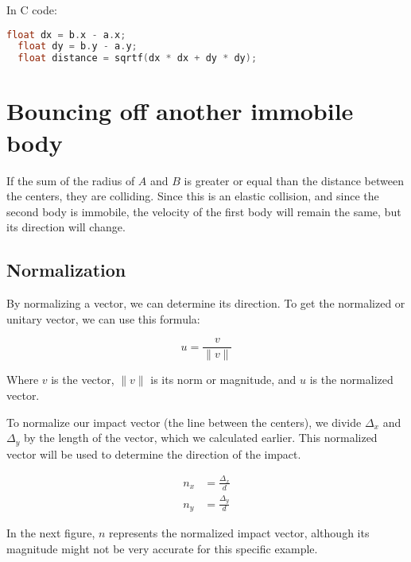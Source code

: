 \documentclass{amsart}
\begin{document}
In C code:

\begin{lstlisting}[language=C]
  float dx = b.x - a.x;
  float dy = b.y - a.y;
  float distance = sqrtf(dx * dx + dy * dy);
\end{lstlisting}

\section{Bouncing off another immobile body}

If the sum of the radius of $A$ and $B$ is greater or equal than the distance
between the centers, they are colliding. Since this is an elastic collision, and
since the second body is immobile, the velocity of the first body will remain
the same, but its direction will change.

\subsection{Normalization}

By normalizing a vector, we can determine its direction. To get the normalized
or unitary vector, we can use this formula:

\begin{displaymath}
  u = \frac{v}{\|v\|}
\end{displaymath}

Where $v$ is the vector, $\|v\|$ is its norm or magnitude, and $u$ is the
normalized vector.

To normalize our impact vector (the line between the centers), we divide
$\Delta_x$ and $\Delta_y$ by the length of the vector, which we calculated
earlier. This normalized vector will be used to determine the direction of the
impact.

\begin{align*}
  n_x &= \frac{\Delta_x}{d} \\
  n_y &= \frac{\Delta_y}{d}
\end{align*}

In the next figure, $n$ represents the normalized impact vector, although its
magnitude might not be very accurate for this specific example.
\end{document}
